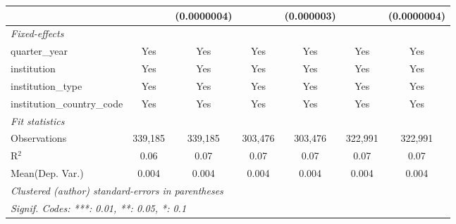 \begin{tabular}{lcccccc}
                                      &                & (0.0000004)   &              & (0.000003) &                & (0.0000004)\\   
   \midrule
   \emph{Fixed-effects}\\
   quarter\_year                      & Yes            & Yes           & Yes          & Yes        & Yes            & Yes\\  
   institution                        & Yes            & Yes           & Yes          & Yes        & Yes            & Yes\\  
   institution\_type                  & Yes            & Yes           & Yes          & Yes        & Yes            & Yes\\  
   institution\_country\_code         & Yes            & Yes           & Yes          & Yes        & Yes            & Yes\\  
   \midrule
   \emph{Fit statistics}\\
   Observations                       & 339,185        & 339,185       & 303,476      & 303,476    & 322,991        & 322,991\\  
   R$^2$                              & 0.06           & 0.07          & 0.07         & 0.07       & 0.07           & 0.07\\  
Mean(Dep. Var.) & 0.004 & 0.004 & 0.004 & 0.004 & 0.004 & 0.004 \\
   \midrule \midrule
   \multicolumn{7}{l}{\emph{Clustered (author) standard-errors in parentheses}}\\
   \multicolumn{7}{l}{\emph{Signif. Codes: ***: 0.01, **: 0.05, *: 0.1}}\\
\end{tabular}
\par\endgroup
